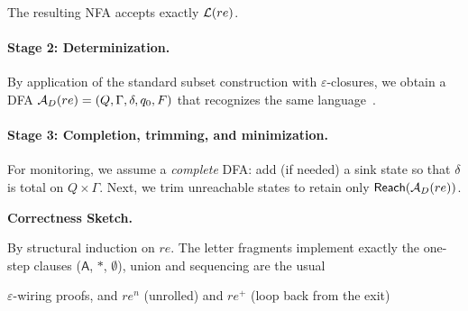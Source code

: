 The resulting NFA accepts exactly $\mathcal{L}\!\left(re\right)$.

\paragraph*{Stage 2: Determinization.}

By application of the standard subset construction with $\varepsilon$-closures, we obtain a DFA $\mathcal{A}_D(re)=(Q,\Gamma,\delta,q_0,F)$ that recognizes the same language~\cite{RabinScott1959,HopcroftUllman2001}.

\paragraph*{Stage 3: Completion, trimming, and minimization.}
For monitoring, we assume a \emph{complete} DFA: add (if needed) a sink state so that $\delta$ is total on $Q\times\Gamma$.
Next, we trim unreachable states to retain only $\mathsf{Reach}(\mathcal{A}_D(re))$.

\medskip

\noindent

\textbf{Correctness Sketch.}

By structural induction on $re$. The letter fragments implement exactly the one-step clauses (\(\mathsf{A}\), $*$, $\emptyset$), union and sequencing are the usual

$\varepsilon$-wiring proofs, and $re^n$ (unrolled) and $re^+$ (loop back from the exit)

